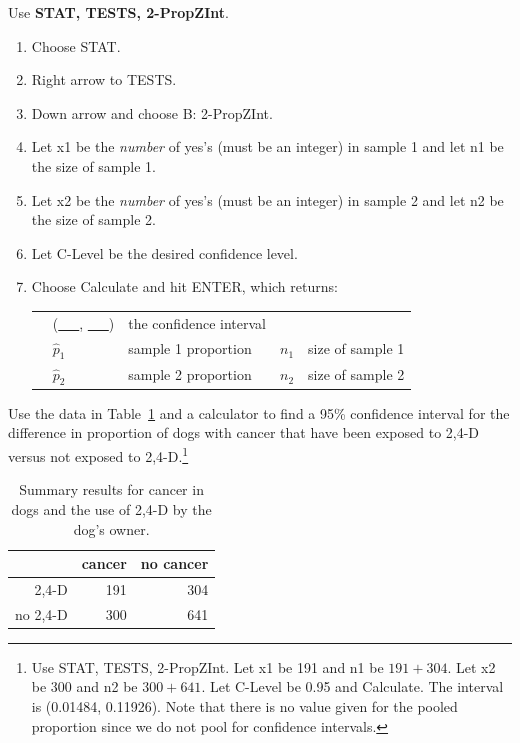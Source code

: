 \begin{termBox}{
Use \textbf{STAT, TESTS, 2-PropZInt}.
\begin{enumerate}
\setlength{\itemsep}{0mm}
\item Choose STAT.
\item Right arrow to TESTS.
\item Down arrow and choose B: 2-PropZInt.
\item Let x1 be the \emph{number} of yes's (must be an integer) in sample 1 and let n1 be the size of sample 1.
\item Let x2 be the \emph{number} of yes's (must be an integer) in sample 2 and let n2 be the size of sample 2.
\item Let C-Level be the desired confidence level.
\item Choose Calculate and hit ENTER, which returns: \\
\begin{tabular}{l ll ll}
\hspace{3mm}&
(\underline{\ \ \ }, \underline{\ \ \ })
	&\quad  the confidence interval \\
&
$\hat{p}_1$
	&\quad  sample 1 proportion
	&\quad	$n_1$
	&\quad  size of sample 1 \\
&
$\hat{p}_2$
	&\quad  sample 2 proportion
	&\quad	$n_2$
	&\quad  size of sample 2
\end{tabular}
\end{enumerate}
}
\end{termBox}

\begin{exercise}{Use the data in Table~\ref{24DAndCancerInDogsTableInCalcSection} and a calculator to find a 95\% confidence interval for the difference in proportion of dogs with cancer that have been exposed to 2,4-D versus not exposed to 2,4-D.}\footnote{Use STAT, TESTS, 2-PropZInt. Let x1 be 191 and n1 be $191+304$. Let x2 be 300 and n2 be $300+641$. Let C-Level be 0.95 and Calculate. The interval is (0.01484, 0.11926). Note that there is no value given for the pooled proportion since we do not pool for confidence intervals.}
\end{exercise}

\begin{table}[h]
\centering
\begin{tabular}{rrr}
  \hline
 & cancer & no cancer \\
  \hline
2,4-D & 191 & 304 \\
no 2,4-D & 300 & 641 \\
   \hline
\end{tabular}
\caption{Summary results for cancer in dogs and the use of 2,4-D by the dog's owner.}
\label{24DAndCancerInDogsTableInCalcSection}
\end{table}

